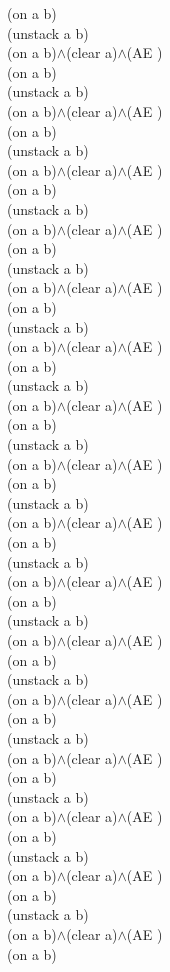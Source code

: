 {{(on a b)\\
(unstack a b)\\
(on a b)$\wedge$(clear a)$\wedge$(AE )\\
(on a b)\\
(unstack a b)\\
(on a b)$\wedge$(clear a)$\wedge$(AE )\\
(on a b)\\
(unstack a b)\\
(on a b)$\wedge$(clear a)$\wedge$(AE )\\
(on a b)\\
(unstack a b)\\
(on a b)$\wedge$(clear a)$\wedge$(AE )\\
(on a b)\\
(unstack a b)\\
(on a b)$\wedge$(clear a)$\wedge$(AE )\\
(on a b)\\
(unstack a b)\\
(on a b)$\wedge$(clear a)$\wedge$(AE )\\
(on a b)\\
(unstack a b)\\
(on a b)$\wedge$(clear a)$\wedge$(AE )\\
(on a b)\\
(unstack a b)\\
(on a b)$\wedge$(clear a)$\wedge$(AE )\\
(on a b)\\
(unstack a b)\\
(on a b)$\wedge$(clear a)$\wedge$(AE )\\
(on a b)\\
(unstack a b)\\
(on a b)$\wedge$(clear a)$\wedge$(AE )\\
(on a b)\\
(unstack a b)\\
(on a b)$\wedge$(clear a)$\wedge$(AE )\\
(on a b)\\
(unstack a b)\\
(on a b)$\wedge$(clear a)$\wedge$(AE )\\
(on a b)\\
(unstack a b)\\
(on a b)$\wedge$(clear a)$\wedge$(AE )\\
(on a b)\\
(unstack a b)\\
(on a b)$\wedge$(clear a)$\wedge$(AE )\\
(on a b)\\
(unstack a b)\\
(on a b)$\wedge$(clear a)$\wedge$(AE )\\
(on a b)\\
(unstack a b)\\
(on a b)$\wedge$(clear a)$\wedge$(AE )\\
(on a b)\\
}%
}

